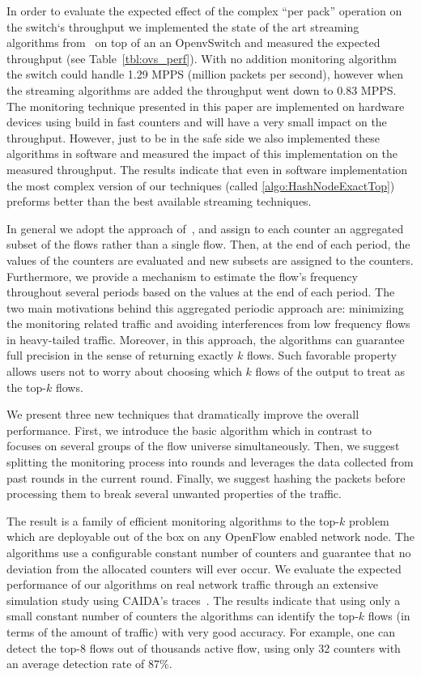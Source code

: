 In order to evaluate the expected effect of the complex ``per pack'' operation on the switch`s throughput we implemented the state of the art streaming algorithms from~\cite{Ben-Basat2017} on top of an an OpenvSwitch and measured the expected throughput (see Table~\ref{tbl:ovs_perf}).  With no addition monitoring algorithm the switch could handle 1.29 MPPS (million packets per second), however when the streaming algorithms are added the throughput went down to 0.83 MPPS.  The monitoring technique presented in this paper are implemented on hardware devices using build in fast counters and will have a very small impact on the throughput.  However, just to be in the safe side we also implemented these algorithms in software and measured the impact of this implementation on the measured throughput. The results indicate that even in software implementation the most complex version of our techniques (called \ref{algo:HashNodeExactTop}) preforms better than the best available streaming techniques. 

In general we adopt the approach of~\cite{Moraney2016}, and assign to each counter an aggregated subset of the flows rather than a single flow. Then, at the end of each period, the values of the counters are evaluated and new subsets are assigned to the counters. Furthermore, we provide a mechanism to estimate the flow's frequency throughout several periods based on the values at the end of each period. The two main motivations behind this aggregated periodic approach are: minimizing the monitoring related traffic and avoiding interferences from low frequency flows in heavy-tailed traffic. Moreover, in this approach, the algorithms can guarantee full precision in the sense of returning exactly $k$ flows. Such favorable property allows users not to worry about choosing which $k$ flows of the output to treat as the top-$k$ flows.

We present three new techniques that dramatically improve the overall performance. 
First, we introduce the basic algorithm which in contrast to~\cite{Moraney2016} focuses on several groups of the flow universe simultaneously.
Then, we suggest splitting the monitoring process into rounds and leverages the data collected from past rounds in the current round.
Finally, we suggest hashing the packets before processing them to break several unwanted properties of the traffic.

The result is a family of efficient monitoring algorithms to the top-$k$ problem which are deployable out of the box on any OpenFlow enabled network node. The algorithms use a configurable constant number of counters and guarantee that no deviation from the allocated counters will ever occur.  We evaluate the expected performance of our algorithms on real network traffic through an extensive simulation study using CAIDA’s traces~\cite{CAIDA14,CAIDA15,CAIDA2016}.  The results indicate that using only a small constant number of counters the algorithms can identify the top-$k$ flows (in terms of the amount of traffic) with very good accuracy.  For example, one can detect the top-8 flows out of thousands active flow, using only 32 counters with an average detection rate of 87\%. 

